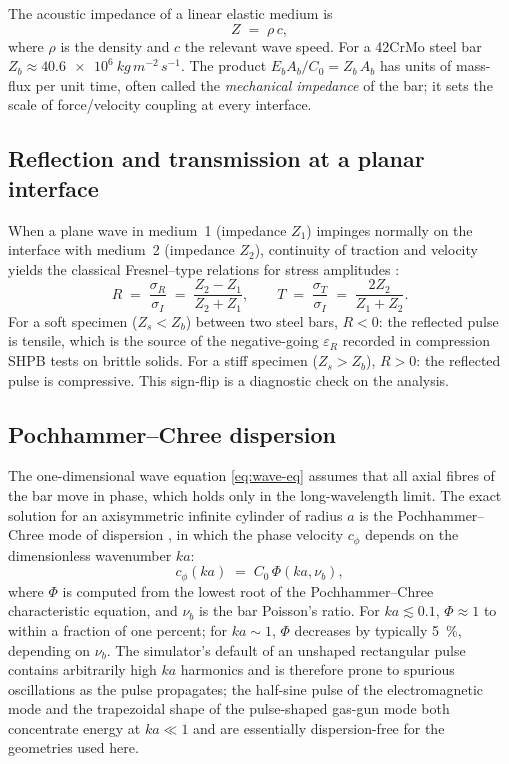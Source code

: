 \documentclass[11pt,a4paper,openany]{book}
\providecommand{\SI}[2]{\qty{#1}{#2}}
\theoremstyle{handbook}
\newcommand{\sig}{\sigma}
\newcommand{\eps}{\varepsilon}
\newcommand{\Cz}{C_0}
\newcommand{\Ab}{A_b}
\begin{document}
The acoustic impedance of a linear elastic medium is
\begin{equation}
  Z \;=\; \rho\,c,
\end{equation}
where $\rho$ is the density and $c$ the relevant wave speed. For a 42CrMo
steel bar $Z_b \approx \SI{40.6e6}{kg\,m^{-2}\,s^{-1}}$. The product $E_b\Ab/\Cz
= Z_b\,\Ab$ has units of mass-flux per unit time, often called the
\emph{mechanical impedance} of the bar; it sets the scale of force/velocity
coupling at every interface.

\subsection{Reflection and transmission at a planar interface}

When a plane wave in medium~1 (impedance $Z_1$) impinges normally on the
interface with medium~2 (impedance $Z_2$), continuity of traction and
velocity yields the classical Fresnel--type relations for stress amplitudes
\cite{Graff1975}:
\begin{equation}
  R \;=\; \frac{\sig_R}{\sig_I} \;=\; \frac{Z_2 - Z_1}{Z_2 + Z_1},
  \qquad
  T \;=\; \frac{\sig_T}{\sig_I} \;=\; \frac{2 Z_2}{Z_1 + Z_2}.
  \label{eq:Fresnel}
\end{equation}
For a soft specimen ($Z_s < Z_b$) between two steel bars, $R < 0$: the
reflected pulse is tensile, which is the source of the negative-going
$\eps_R$ recorded in compression SHPB tests on brittle solids. For a stiff
specimen ($Z_s > Z_b$), $R > 0$: the reflected pulse is compressive. This
sign-flip is a diagnostic check on the analysis.

\subsection{Pochhammer--Chree dispersion}\label{sec:dispersion}

The one-dimensional wave equation \eqref{eq:wave-eq} assumes that all axial
fibres of the bar move in phase, which holds only in the long-wavelength
limit. The exact solution for an axisymmetric infinite cylinder of radius
$a$ is the Pochhammer--Chree mode of dispersion \cite{Davies1948,GrahamPC},
in which the phase velocity $c_\phi$ depends on the dimensionless wavenumber
$ka$:
\begin{equation}
  c_\phi(ka) \;=\; \Cz\,\Phi(ka,\nu_b),
\end{equation}
where $\Phi$ is computed from the lowest root of the Pochhammer--Chree
characteristic equation, and $\nu_b$ is the bar Poisson's ratio. For
$ka \lesssim 0.1$, $\Phi \approx 1$ to within a fraction of one percent; for
$ka \sim 1$, $\Phi$ decreases by typically \SI{5}{\percent}, depending on
$\nu_b$. The simulator's default of an unshaped rectangular pulse contains
arbitrarily high $ka$ harmonics and is therefore prone to spurious
oscillations as the pulse propagates; the half-sine pulse of the
electromagnetic mode and the trapezoidal shape of the pulse-shaped gas-gun
mode both concentrate energy at $ka \ll 1$ and are essentially
dispersion-free for the geometries used here.
\end{document}
